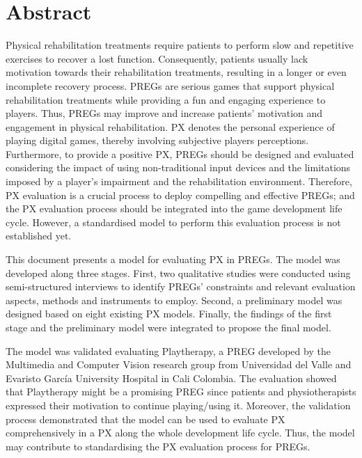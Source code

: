 

\begingroup
\let\clearpage\relax
\let\cleardoublepage\relax
\let\cleardoublepage\relax

\chapter*{Abstract} %

Physical rehabilitation treatments require patients to perform slow and repetitive exercises to recover a lost function. Consequently, patients usually lack motivation towards their rehabilitation treatments, resulting in a longer or even incomplete recovery process. \acp{PREG} are serious games that support physical rehabilitation treatments while providing a fun and engaging experience to players. Thus, \acp{PREG} may improve and increase patients' motivation and engagement in physical rehabilitation. \ac{PX} denotes the personal experience of playing digital games, thereby involving subjective players perceptions. Furthermore, to provide a positive \ac{PX}, \acp{PREG} should be designed and evaluated considering the impact of using non-traditional input devices and the limitations imposed by a player's impairment and the rehabilitation environment. Therefore, \ac{PX} evaluation is a crucial process to deploy compelling and effective \acp{PREG}; and the \ac{PX} evaluation process should be integrated into the game development life cycle. However, a standardised model to perform this evaluation process is not established yet.

This document presents a model for evaluating \ac{PX} in \acp{PREG}. The model was developed along three stages. First, two qualitative studies were conducted using semi-structured interviews to identify \acp{PREG}' constraints and relevant evaluation aspects, methods and instruments to employ. Second, a preliminary model was designed based on eight existing \ac{PX} models. Finally, the findings of the first stage and the preliminary model were integrated to propose the final model.

The model was validated evaluating Playtherapy, a \ac{PREG} developed by the Multimedia and Computer Vision research group from Universidad del Valle and Evaristo Garc\'ia University Hospital in Cali Colombia. The evaluation showed that Playtherapy might be a promising \ac{PREG} since patients and physiotherapists expressed their motivation to continue playing/using it. Moreover, the validation process demonstrated that the model can be used to evaluate \ac{PX} comprehensively in a \ac{PX} along the whole development life cycle. Thus, the model may contribute to standardising the \ac{PX} evaluation process for \acp{PREG}. 
\endgroup			

\vfill